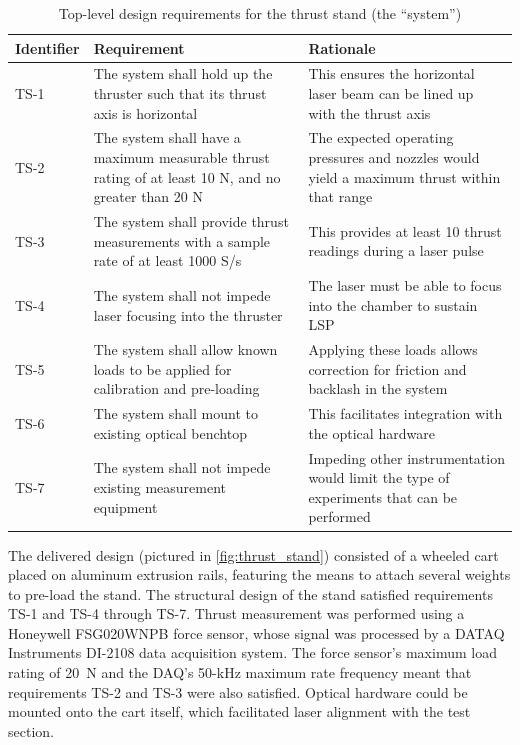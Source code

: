             \begin{table}[h]
                \renewcommand{\arraystretch}{1.3}
                \centering
                \caption[Top-level design requirements for the thrust stand]{Top-level design requirements for the thrust stand (the ``system'')}
                \label{tab:tsReq}
                \begin{tabular}{l>{\raggedright}p{}p{}<{\raggedright}}
                    \toprule
                    Identifier  & Requirement   & Rationale \\
                    \midrule
                    TS-1 &  The system shall hold up the thruster such that its thrust axis is horizontal & This ensures the horizontal laser beam can be lined up with the thrust axis \\
                    TS-2 &  The system shall have a maximum measurable thrust rating of at least 10 N, and no greater than 20 N &  The expected operating pressures and nozzles would yield a maximum thrust within that range\\
                    TS-3 &  The system shall provide thrust measurements with a sample rate of at least 1000 S/s & This provides at least 10 thrust readings during a laser pulse \\
                    TS-4 &  The system shall not impede laser focusing into the thruster & The laser must be able to focus into the chamber to sustain LSP \\
                    TS-5 &  The system shall allow known loads to be applied for calibration and pre-loading & Applying these loads allows correction for friction and backlash in the system \\
                    TS-6 &  The system shall mount to existing optical benchtop & This facilitates integration with the optical hardware \\
                    TS-7 &  The system shall not impede existing measurement equipment & Impeding other instrumentation would limit the type of experiments that can be performed \\
                    \bottomrule
                \end{tabular}
            \end{table}

            The delivered design (pictured in \autoref{fig:thrust_stand}) consisted of a wheeled cart placed on aluminum extrusion rails, featuring the means to attach several weights to pre-load the stand. The structural design of the stand satisfied requirements TS-1 and TS-4 through TS-7. Thrust measurement was performed using a Honeywell FSG020WNPB force sensor, whose signal was processed by a DATAQ Instruments DI-2108 data acquisition system. The force sensor's maximum load rating of \qty{20}{N} and the DAQ's \num{50}-\unit{kHz} maximum rate frequency meant that requirements TS-2 and TS-3 were also satisfied. Optical hardware could be mounted onto the cart itself, which facilitated laser alignment with the test section.

